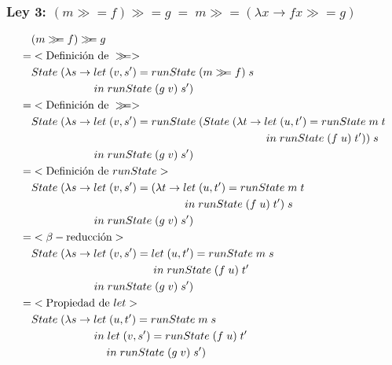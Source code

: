 \documentclass[a4paper]{report}
\newcommand{\bind}{\gg\!\!=}
\begin{document}
\subsubsection*{Ley 3: $(m \bind f) \bind g \; = \; m \bind (\lambda x \to f x \bind g)$}
\begin{align*}
    & (m \bind f) \bind g \\
    = & < \text{Definici\'on de } \bind > \\
    & State\; (\lambda s \to let\; (v,s') = runState\; (m \bind f)\; s\\
    & \hspace{2cm} in\; runState\; (g\; v)\; s') \\
    = & < \text{Definici\'on de } \bind > \\
    & State\; (\lambda s \to let\; (v,s') = runState\; (State\;
            (\lambda t \to let\; (u,t') = runState\; m\; t \\
    & \hspace{7.5cm} in\; runState\; (f\; u)\; t'))\; s \\
    & \hspace{2cm} in\; runState\; (g\; v)\; s') \\
    = & < \text{Definici\'on de } runState > \\
    & State\; (\lambda s \to let\; (v,s') = (\lambda t \to
            let\; (u,t') = runState\; m\; t \\
    & \hspace{4.9cm} in\; runState\; (f\; u)\; t')\; s \\
    & \hspace{2cm} in\; runState\; (g\; v)\; s') \\
    = & < \beta -\text{reducci\'on} > \\
    & State\; (\lambda s \to let\; (v,s') = let\; (u,t') = runState\; m\; s \\
    & \hspace{3.9cm} in\; runState\; (f\; u)\; t' \\
    & \hspace{2cm} in\; runState\; (g\; v)\; s') \\
    = & < \text{Propiedad de } let > \\
    & State\; (\lambda s \to let\; (u,t') = runState\; m \; s \\
    & \hspace{2cm} in\; let\; (v,s') = runState\; (f\; u)\; t' \\
    & \hspace{2.4cm} in\; runState\; (g\; v)\; s') \\

\end{align*}
\end{document}
